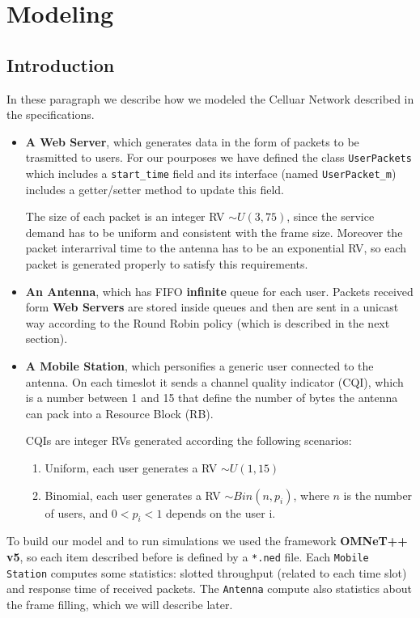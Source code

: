 \chapter{Modeling}
\section{Introduction}
In these paragraph we describe how we modeled the Celluar Network described in the specifications.
\begin{itemize}
   \item \textbf{A Web Server}, which generates data in the form of packets to be trasmitted to users. For our pourposes we have defined the class \texttt{UserPackets} which includes a \texttt{start\_time} field and its interface (named \texttt{UserPacket\_m}) includes a getter/setter method to update this field.
   
   The size of each packet is an integer RV \(\sim U(3,75)\), since the service demand has to be uniform and consistent with the frame size. Moreover the packet interarrival time to the antenna has to be an exponential RV, so each packet is generated properly to satisfy this requirements.

   \item \textbf{An Antenna}, which has FIFO \textbf{infinite} queue for each user. Packets received form \textbf{Web Servers} are stored inside queues and then are sent in a unicast way according to the Round Robin policy (which is described in the next section). 
   
   \item \textbf{A Mobile Station}, which personifies a generic user connected to the antenna. On each timeslot it sends a channel quality indicator (CQI), which is a number between 1 and 15 that define the number of bytes the antenna can pack into a Resource Block (RB).
   
   CQIs are integer RVs generated according the following scenarios:
   
   \begin{enumerate} 
    \item Uniform, each user generates a RV \(\sim U(1,15)\)
    \item Binomial, each user generates a RV \(\sim Bin(n,p_i)\), where \(n\) is the number of users, and \( 0<p_i<1\) depends on the user i.
    \end{enumerate} 
\end{itemize}
To build our model and to run simulations we used the framework \textbf{OMNeT++ v5}, so each item described before is defined by a \texttt{*.ned} file.
Each \texttt{Mobile Station} computes some statistics: slotted throughput (related to each time slot) and response time of received packets. The \texttt{Antenna} compute also statistics about the frame filling, which we will describe later.

